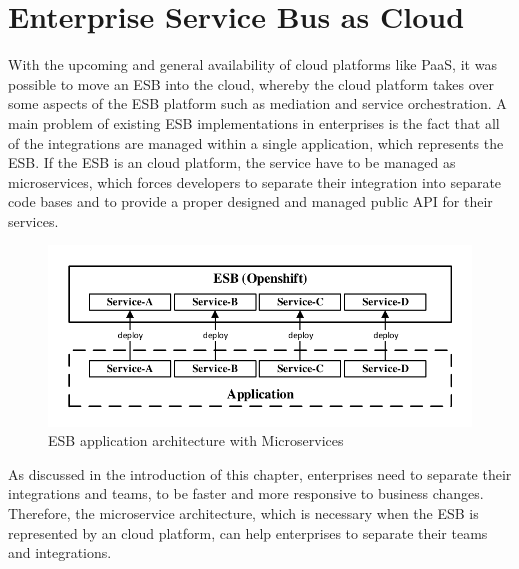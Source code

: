 \section{Enterprise Service Bus as Cloud}
\label{sec:esb-as-cloud}
With the upcoming and general availability of cloud platforms like PaaS, it was possible to move an ESB into the cloud, whereby the cloud platform takes over some aspects of the ESB platform such as mediation and service orchestration. A main problem of existing ESB implementations in enterprises is the fact that all of the integrations are managed within a single application, which represents the ESB. If the ESB is an cloud platform, the service have to be managed as microservices, which forces developers to separate their integration into separate code bases and to provide a proper designed and managed public API for their services.

\begin{figure}[htbp]
	\centering
	\includegraphics[scale=1]{images/esb-cloud-architecture.pdf}
	\caption{ESB application architecture with Microservices}
	\label{fig:esb-cloud-architecture}
\end{figure} 

As discussed in the introduction of this chapter, enterprises need to separate their integrations and teams, to be faster and more responsive to business changes. Therefore, the microservice architecture, which is necessary when the ESB is represented by an cloud platform, can help enterprises to separate their teams and integrations.  